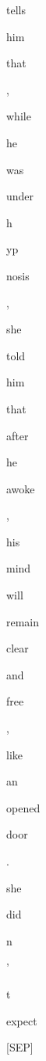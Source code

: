 \documentclass[varwidth=150mm]{standalone}
\begin{document}
\begin{CJK*}{UTF8}{gbsn}
{{{\colorbox{red!2.0360701084136963}{\strut tells} \colorbox{red!0.0}{\strut him} \colorbox{red!0.0}{\strut that} \colorbox{red!0.0}{\strut ,} \colorbox{red!0.0}{\strut while} \colorbox{red!0.0}{\strut he} \colorbox{red!0.0}{\strut was} \colorbox{red!0.0}{\strut under} \colorbox{red!1.4747833013534546}{\strut h}\colorbox{red!0.0}{\strut yp}\colorbox{red!0.0}{\strut nosis} \colorbox{red!0.0}{\strut ,} \colorbox{red!0.0}{\strut she} \colorbox{red!0.0}{\strut told} \colorbox{red!0.0}{\strut him} \colorbox{red!0.0}{\strut that} \colorbox{red!0.0}{\strut after} \colorbox{red!0.0}{\strut he} \colorbox{red!0.0}{\strut awoke} \colorbox{red!0.0}{\strut ,} \colorbox{red!0.0}{\strut his} \colorbox{red!0.0}{\strut mind} \colorbox{red!1.6986360549926758}{\strut will} \colorbox{red!0.0}{\strut remain} \colorbox{red!0.0}{\strut clear} \colorbox{red!0.0}{\strut and} \colorbox{red!0.0}{\strut free} \colorbox{red!0.0}{\strut ,} \colorbox{red!0.0}{\strut like} \colorbox{red!0.0}{\strut an} \colorbox{red!0.0}{\strut opened} \colorbox{red!0.0}{\strut door} \colorbox{red!0.0}{\strut .} \colorbox{red!0.0}{\strut she} \colorbox{red!0.0}{\strut did} \colorbox{red!100.0}{\strut n} \colorbox{red!0.0}{\strut '} \colorbox{red!0.0}{\strut t} \colorbox{red!0.0}{\strut expect} \colorbox{red!0.0}{\strut [SEP]}
}}}
\end{CJK*}
\end{document}
